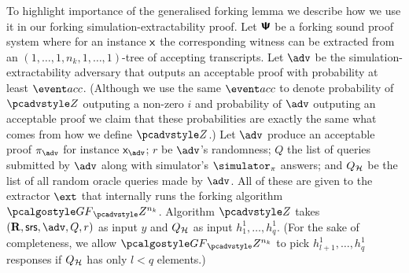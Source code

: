 \documentclass[runningheads,10pt]{llncs}
\let\spvec\vec
\let\vec\accentvec
\let\spvec\vec
\let\vec\spvec
\def\vec#1{\mathchoice{\mbox{\boldmath$\displaystyle#1$}}
  {\mbox{\boldmath$\textstyle#1$}} {\mbox{\boldmath$\scriptstyle#1$}}
  {\mbox{\boldmath$\scriptscriptstyle#1$}}}
\begin{document}


To highlight importance of the generalised forking lemma we describe how we use
it in our forking simulation-extractability proof.  Let $\bm{\mathsf{\Psi}}$ be a
forking sound proof system where for an instance $\mathsf{x}$ the
corresponding witness can be extracted from an
$(1, \ldots, 1, n_k, 1, \ldots, 1)$-tree of accepting transcripts.  Let $\advse$
be the simulation-extractability adversary that outputs an acceptable proof with
probability at least $\accProb$. (Although we use the same $\accProb$ to denote
probability of $\zdv$ outputing a non-zero $i$ and probability of $\advse$
outputing an acceptable proof we claim that these probabilities are exactly the
same what comes from how we define $\zdv$.)  Let $\advse$ produce an acceptable
proof $\zkproof_{\advse}$ for instance $\inp_{\advse}$; $r$ be $\advse$'s
randomness; $Q$ the list of queries submitted by $\advse$ along with simulator's
$\simulator_\zkproof$ answers; and $Q_{\mathcal{H}}$ be the list of all random oracle
queries made by $\advse$.  All of these are given to the extractor $\ext$ that
internally runs the forking algorithm $\genforking_\zdv^{n_k}$.  Algorithm $\zdv$
takes $(\REL, \srs, \advse,
Q, r)$ as input $y$ and $Q_{\mathcal{H}}$ as input $h_1^1, \ldots,
h_q^1$. 
(For the sake of completeness, we allow $\genforking_\zdv^{n_k}$ to
pick $h^1_{l + 1}, \ldots, h^1_q$ responses if $Q_{\mathcal{H}}$ has only $l < q$
elements.)  
\end{document}
